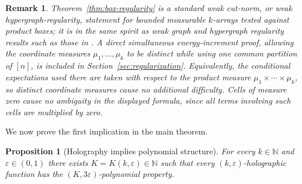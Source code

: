 \documentclass[11pt]{amsart}
\newtheorem{proposition}[theorem]{Proposition}
\newtheorem{remark}[theorem]{Remark}
\newcommand{\N}{\mathbb N}
\newcommand{\1}{\mathbf 1}
\begin{document}
\begin{remark}
Theorem~\ref{thm:box-regularity} is a standard weak cut-norm, or weak hypergraph-regularity, statement for bounded measurable $k$-arrays tested against product boxes; it is in the same spirit as weak graph and hypergraph regularity results such as those in \cite{FriezeKannan,Gowers,Tao,RodlSchacht}.  A direct simultaneous energy-increment proof, allowing the coordinate measures $\mu_1,\ldots,\mu_k$ to be distinct while using one common partition of $[n]$, is included in Section~\ref{sec:regularization}.  Equivalently, the conditional expectations used there are taken with respect to the product measure $\mu_1\times\cdots\times\mu_k$, so distinct coordinate measures cause no additional difficulty.  Cells of measure zero cause no ambiguity in the displayed formula, since all terms involving such cells are multiplied by zero.
\end{remark}

We now prove the first implication in the main theorem.

\begin{proposition}[Holography implies polynomial structure]\label{prop:holo-poly}
For every $k\in\N$ and $\varepsilon\in(0,1)$ there exists $K=K(k,\varepsilon)\in\N$ such that every $(k,\varepsilon)$-holographic function has the $(K,3\varepsilon)$-polynomial property.
\end{proposition}
\end{document}
